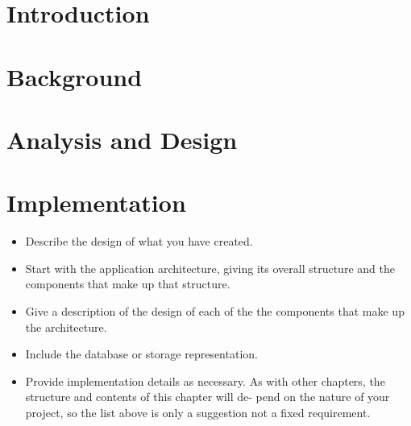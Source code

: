 \documentclass[ openright,titlepage,numbers=noenddot,headinclude,%
                footinclude=true,BCOR=5mm,paper=a4,fontsize=12pt,a4paper,english%
                ]{scrreprt}
\begin{document}




\pagestyle{scrheadings}

\chapter{Introduction}
\label{Chapters/Introduction}






\chapter{Background}
\label{Chapters/Background}





\chapter{Analysis and Design}
\label{Chapters/Analysis-and-Design}





\chapter{Implementation}
\label{Chapters/Implementation}

\begin{itemize}
\item Describe the design of what you have created.
\item Start with the application architecture, giving its overall structure and the components that make up that structure.
\item Give a description of the design of each of the the components that make up the architecture.
\item Include the database or storage representation.
\item Provide implementation details as necessary.
As with other chapters, the structure and contents of this chapter will de- pend on the nature of your project, so the list above is only a suggestion not a fixed requirement.
\end{itemize}
\end{document}
